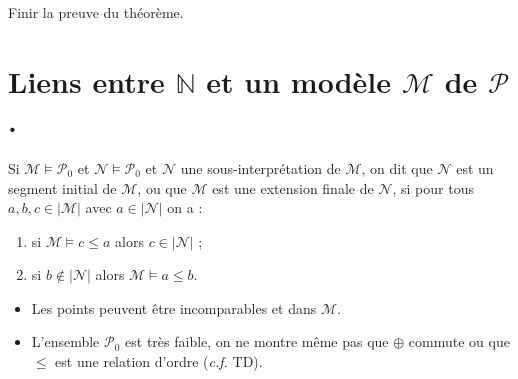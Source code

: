 \documentclass[./main]{subfiles}
\begin{document}
  \begin{exo}
    Finir la preuve du théorème.
  \end{exo}

  \section{Liens entre $\mathds{N}$ et un modèle $\mathcal{M}$ de $\mathcal{P}$.}

  \begin{defn}
     Si $\mathcal{M} \models \mathcal{P}_0$ et $\mathcal{N} \models \mathcal{P}_0$ et $\mathcal{N}$ une sous-interprétation de $\mathcal{M}$, on dit que $\mathcal{N}$ est un segment initial de $\mathcal{M}$, ou que $\mathcal{M}$ est une extension finale de $\mathcal{N}$, si pour tous $a,b,c \in |\mathcal{M}|$ avec $a \in |\mathcal{N}|$ on a :
    \begin{enumerate}
      \item si $\mathcal{M} \models c \le a$ alors $c \in |\mathcal{N}|$ ;
      \item si $b \not\in |\mathcal{N}|$ alors $\mathcal{M} \models a \le b$.
    \end{enumerate}
  \end{defn}

  \begin{figure}[H]
    \centering
  \end{figure}

  \begin{rmk}
    \begin{itemize}
      \item Les points peuvent être incomparables et dans $\mathcal{M}$.
      \item L'ensemble $\mathcal{P}_0$ est très faible, on ne montre même pas que $\oplus$ commute ou que $\le$ est une relation d'ordre (\textit{c.f.} TD).
    \end{itemize}
  \end{rmk}
\end{document}
